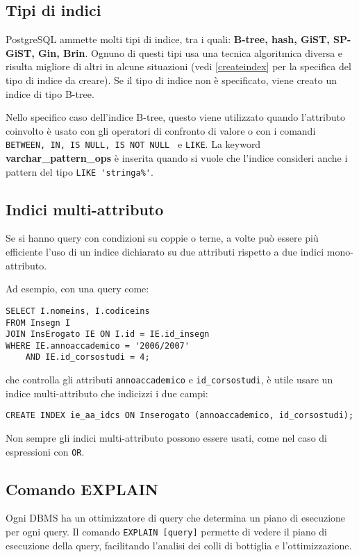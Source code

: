 \documentclass[a4paper, 10pt]{article}
\begin{document}
	\subsection{Tipi di indici}
	PostgreSQL ammette molti tipi di indice, tra i quali: \textbf{B-tree, hash, GiST, SP-GiST, Gin, Brin}.
	Ognuno di questi tipi usa una tecnica algoritmica diversa e risulta migliore di altri in alcune situazioni (vedi \ref{createindex} per la specifica del tipo di indice da creare).
	Se il tipo di indice non è specificato, viene creato un indice di tipo B-tree.
	
	 Nello specifico caso dell'indice B-tree, questo viene utilizzato quando l'attributo coinvolto è usato con gli operatori di confronto di valore o con i comandi \lstinline|BETWEEN, IN, IS NULL, IS NOT NULL | e \lstinline|LIKE|.
	 La keyword \textbf{varchar\_pattern\_ops} è inserita quando si vuole che l'indice consideri anche i pattern del tipo \lstinline|LIKE 'stringa%'|.
	 
	 \subsection{Indici multi-attributo}
	 Se si hanno query con condizioni su coppie o terne, a volte può essere più efficiente l'uso di un indice dichiarato su due attributi rispetto a due indici mono-attributo.
	 

	 
	 Ad esempio, con una query come:
	 \begin{lstlisting}
SELECT I.nomeins, I.codiceins
FROM Insegn I
JOIN InsErogato IE ON I.id = IE.id_insegn
WHERE IE.annoaccademico = '2006/2007'
	AND IE.id_corsostudi = 4;
	 \end{lstlisting}
	 che controlla gli attributi \verb|annoaccademico| e \verb|id_corsostudi|, è utile usare un indice multi-attributo che indicizzi i due campi:
	 \begin{lstlisting}
CREATE INDEX ie_aa_idcs ON Inserogato (annoaccademico, id_corsostudi);
	 \end{lstlisting}
	 Non sempre gli indici multi-attributo possono essere usati, come nel caso di espressioni con \lstinline|OR|.
	 
 	\subsection{Comando EXPLAIN}
	Ogni DBMS ha un ottimizzatore di query che determina un piano di esecuzione per ogni query. Il comando \lstinline|EXPLAIN [query]| permette di vedere il piano di esecuzione della query, facilitando l'analisi dei colli di bottiglia e l'ottimizzazione.
	
\end{document}
